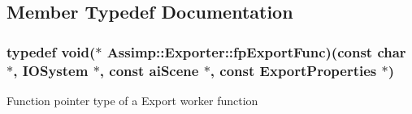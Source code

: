 \subsection{Member Typedef Documentation}
\hypertarget{class_assimp_1_1_exporter_a2e0f2340bca5a7e4f443cbc256928e88}{
\subsubsection[{fp\-Export\-Func}]{\setlength{\rightskip}{0pt plus 5cm}typedef void($\ast$ Assimp\-::\-Exporter\-::fp\-Export\-Func)(const char $\ast$, {\bf I\-O\-System} $\ast$, const {\bf ai\-Scene} $\ast$, const {\bf Export\-Properties} $\ast$)}}\label{class_assimp_1_1_exporter_a2e0f2340bca5a7e4f443cbc256928e88}
Function pointer type of a Export worker function 

